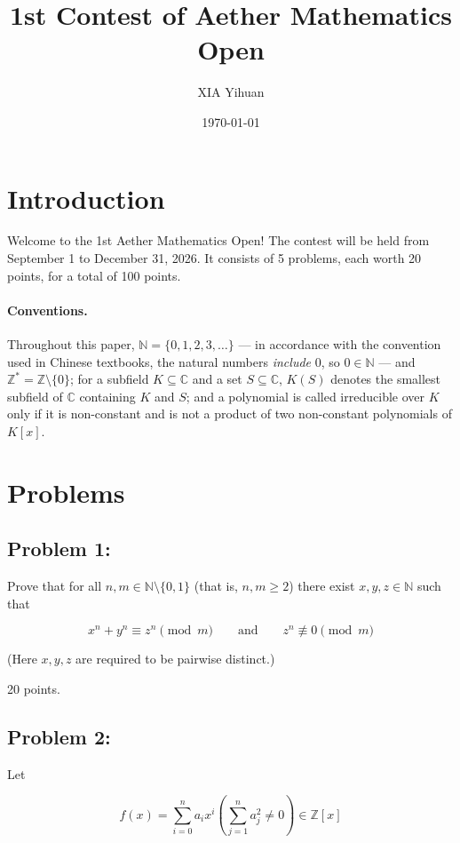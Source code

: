 \documentclass{article}
\title{1st Contest of Aether Mathematics Open}
\author{XIA Yihuan}
\date{\today}
\begin{document}
\maketitle

\section{Introduction}

Welcome to the 1st Aether Mathematics Open!
The contest will be held from September 1 to December 31, 2026.
It consists of 5 problems, each worth 20 points, for a total of 100 points. 

\paragraph{Conventions.}
Throughout this paper,
$\mathbb{N}=\{0,1,2,3,\ldots\}$ --- in accordance with the convention used in
Chinese textbooks, the natural numbers \emph{include} $0$, so $0\in\mathbb{N}$ ---
and $\mathbb{Z}^{*}=\mathbb{Z}\setminus\{0\}$;
for a subfield $K\subseteq\mathbb{C}$ and a set $S\subseteq\mathbb{C}$,
$K(S)$ denotes the smallest subfield of $\mathbb{C}$ containing $K$ and $S$;
and a polynomial is called irreducible over $K$ only if it is non-constant and
is not a product of two non-constant polynomials of $K[x]$.

\section{Problems}
\subsection{Problem 1:}

Prove that for all $n,m\in\mathbb{N}\setminus\{0,1\}$ (that is, $n,m\ge 2$)
there exist $x,y,z\in\mathbb{N}$ such that

$$x^n+y^n \equiv z^n \pmod{m}
\qquad\text{and}\qquad
z^n \not\equiv 0 \pmod{m}$$

(Here $x,y,z$ are required to be pairwise distinct.)

20 points.

\subsection{Problem 2:}

Let 

$$f(x)=\sum_{i=0}^n a_i x^i(\sum_{j=1}^n a_j^2\neq 0)\in \mathbb{Z}[x]$$
\end{document}
